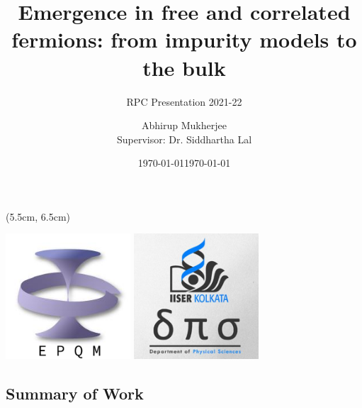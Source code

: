 \documentclass[11pt,aspectratio=169]{beamer}
\title{Emergence in free and correlated fermions: from impurity models to the bulk}
\subtitle{RPC Presentation 2021-22}
\date{\today}
\author{Abhirup Mukherjee\\Supervisor: Dr. Siddhartha Lal}
\institute{Department of Physical Sciences, IISER Kolkata, Mohanpur}
\date{\today}
\begin{document}
\centering

\begin{frame}
\maketitle
\begin{textblock*}{0.4\textwidth}(5.5cm, 6.5cm)
	\centering
	\vspace*{\fill}

	\includegraphics[width=0.35\textwidth]{figures/epqm_logo_mod.jpeg}
	\hspace*{\fill}
	\includegraphics[width=0.35\textwidth]{figures/dps_logo.jpeg}

	\vspace*{\fill}
\end{textblock*}
\end{frame}

\begin{frame}{}
\section{Summary of Work}
\end{frame}
\end{document}
